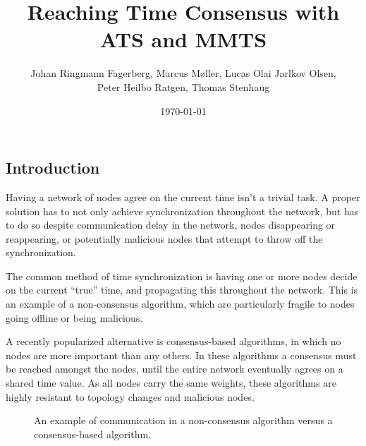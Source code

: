 \documentclass[a0,24pt]{sciposter}
\title{Reaching Time Consensus with ATS and MMTS}
\date{\today}
\author{Johan Ringmann Fagerberg, Marcus Møller, Lucas Olai Jarlkov Olsen,\\
  Peter Heilbo Ratgen, Thomas Stenhaug}
\institute{Institut for Matematik og Datalogi\\
            Syddansk Universitet}
\begin{document}
\maketitle

\begin{multicols}{2}


\section{Introduction}

Having a network of nodes agree on the current time isn't a trivial task. A proper solution has to not only achieve synchronization throughout the network, but has to do so despite communication delay in the network, nodes disappearing or reappearing, or potentially malicious nodes that attempt to throw off the synchronization.

The common method of time synchronization is having one or more nodes decide on the current ``true'' time, and propagating this throughout the network. This is an example of a non-consensus algorithm, which are particularly fragile to nodes going offline or being malicious.

A recently popularized alternative is consensus-based algorithms, in which no nodes are more important than any others. In these algorithms a consensus must be reached amongst the nodes, until the entire network eventually agrees on a shared time value. As all nodes carry the same weights, these algorithms are highly resistant to topology changes and malicious nodes.

\begin{figure}[h!]
    \centering
    \captionsetup{type=figure,width=0.7\textwidth,justification=centering}
    \begin{tikzpicture}[inner sep=0pt,minimum size=0.4cm,scale=4.6]
        
    \end{tikzpicture}
    \hspace{2em}
    \begin{tikzpicture}[inner sep=0pt,minimum size=0.4cm,scale=4.6]
        
    \end{tikzpicture}
    \caption{An example of communication in a non-consensus algorithm versus a consensus-based algorithm.}
\end{figure}


\end{multicols}
\end{document}
